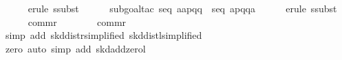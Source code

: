 \begin{isabellebody}
\ \ \ \ \isamarkupfalse%
\ {}erule\ ssubst{}\isanewline
\ \ \ \ \isamarkupfalse%
\ {}subgoal{}tac\ {}seq\ {}a{}{}{}a{}{}p{}{}{}q{}{}{}{}q{}{}{}{}\ {}\ seq\ {}a{}{}p{}{}{}q{}{}{}{}q{}{}{}{}{}a{}{}{}{}\isanewline
\ \ \ \ \isamarkupfalse%
\ {}erule\ ssubst{}\isanewline
\ \ \ \ \isamarkupfalse%
\ {}commr{}\ {}\ {}{}\isanewline
\ \ \ \ \isamarkupfalse%
\ {}commr{}\ {}\ {}{}\isanewline
\ \ \ \ \isamarkupfalse%
\ {}simp\ add{}\ skd{}distr{}simplified{}\ skd{}distl{}simplified{}{}\isanewline
\ \ \ \ \isamarkupfalse%
\ {}zero{}\ auto\ simp\ add{}\ skd{}add{}zerol{}{}\isanewline
\ \ \ \ \isamarkupfalse%
\ {}\isanewline
\ \ \ \ \isamarkupfalse%

\end{isabellebody}
